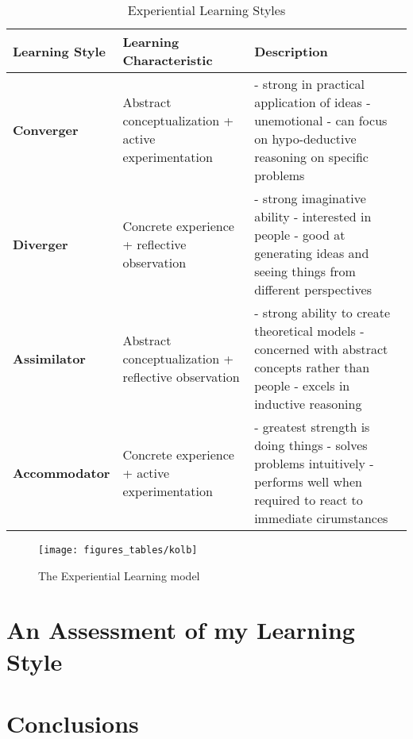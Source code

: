 \documentclass[12pt]{article}
\begin{document}
\begin{singlespacing}
\begin{table}[!htbp]
\begin{tabular}{|l|p{5cm}|p{6cm}|}
    \hline
    \textbf{Learning Style} & \textbf{Learning Characteristic} & \textbf{Description} \\ \hline
    \textbf{Converger} & Abstract conceptualization + active experimentation &
    - strong in practical application of ideas \newline
    - unemotional \newline
    - can focus on hypo-deductive reasoning on specific problems \\ \hline
    \textbf{Diverger} & Concrete experience + reflective observation &
    - strong imaginative ability \newline
    - interested in people \newline
    - good at generating ideas and seeing things from different perspectives \\ \hline
    \textbf{Assimilator} & Abstract conceptualization + reflective observation &
    - strong ability to create theoretical models \newline
    - concerned with abstract concepts rather than people \newline
    - excels in inductive reasoning \\ \hline
    \textbf{Accommodator} & Concrete experience + active experimentation &
    - greatest strength is doing things \newline
    - solves problems intuitively \newline
    - performs well when required to react to immediate cirumstances \\ \hline
\end{tabular}
\caption{Experiential Learning Styles}
\end{table}
\end{singlespacing}

\begin{figure}[!htbp]
    \centering
    \texttt{[image: figures\_tables/kolb]}
    \caption{The Experiential Learning model}
\end{figure}

\section{An Assessment of my Learning Style}

\section{Conclusions}
\end{document}
